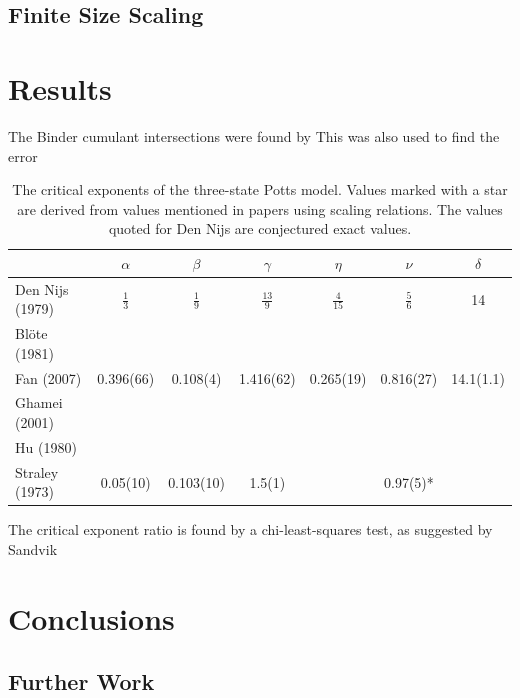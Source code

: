 \documentclass[11pt, a4paper]{report} %
\begin{document}
\section{Finite Size Scaling}

\chapter{Results}
The Binder cumulant intersections were found by
This was also used to find the error
\begin{table}[h]
	\renewcommand{\arraystretch}{1.5}
	\begin{center}
		\begin{tabular}{l | c c c c c c}
			\hline
			& \(\alpha\) & \(\beta\) & \(\gamma\) & \(\eta\) & \(\nu\) & \(\delta\) \\\hline
			Den Nijs (1979)\cite{nijs:1979,baxter:1989} & \(\frac{1}{3}\) & \(\frac{1}{9}\) & \(\frac{13}{9}\) & \(\frac{4}{15}\) & \(\frac{5}{6}\) & 14 \\
			Blöte (1981)\cite{blote:1981} & & \\
			Fan (2007)\cite{fan:2007} & 0.396(66) & 0.108(4) & 1.416(62) & 0.265(19) & 0.816(27) & 14.1(1.1) \\
			Ghamei (2001)\cite{ghaemi:2001} & & \\
			Hu (1980)\cite{hu:1980} & & \\
			Straley (1973)\cite{straley:1973} & 0.05(10)& 0.103(10) & 1.5(1) & & 0.97(5)* &\\\hline
		\end{tabular}
	\end{center}
	\caption{The critical exponents of the three-state Potts model. Values marked with a star are derived from values mentioned in papers using scaling relations. The values quoted for Den Nijs are conjectured exact values.}
\end{table}

The critical exponent ratio is found by a chi-least-squares test, as suggested by Sandvik\cite{sandvik:2011}

\chapter{Conclusions}

\section{Further Work}




\end{document}
